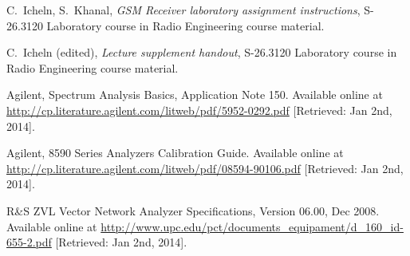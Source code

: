 \documentclass[a4paper, 12pt]{article}
\begin{document}
\newpage
\begin{thebibliography}{9}%

 C.\ Icheln, S.\ Khanal, 
	\textit{GSM Receiver laboratory assignment instructions},
	S-26.3120 Laboratory course in Radio Engineering course material.
	
 C.\ Icheln (edited), 
	\textit{Lecture supplement handout},
	S-26.3120 Laboratory course in Radio Engineering course material.

 Agilent, Spectrum Analysis Basics, Application Note 150. 
	Available online at \url{http://cp.literature.agilent.com/litweb/pdf/5952-0292.pdf} 
	[Retrieved: Jan 2nd, 2014].
	
 Agilent, 8590 Series Analyzers Calibration Guide.
	Available online at \url{http://cp.literature.agilent.com/litweb/pdf/08594-90106.pdf}
	[Retrieved: Jan 2nd, 2014].
	
 R\&S ZVL Vector Network Analyzer Specifications, 
	Version 06.00, Dec 2008. 
	Available online at \url{http://www.upc.edu/pct/documents_equipament/d_160_id-655-2.pdf} 
	[Retrieved: Jan 2nd, 2014].


	

	

\end{thebibliography}
\end{document}
